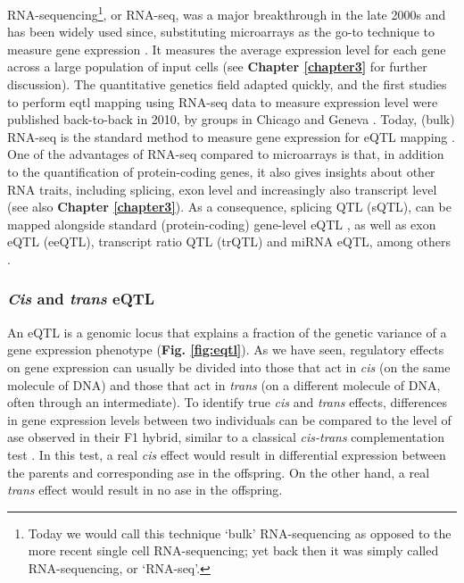 RNA-sequencing\footnote{Today we would call this technique `bulk' RNA-sequencing as opposed to the more recent single cell RNA-sequencing; yet back then it was simply called RNA-sequencing, or `RNA-seq'.}, or RNA-seq, was a major breakthrough in the late 2000s 
and has been widely used since, substituting microarrays as the go-to technique to measure gene expression \cite{weber2015discovering}.
It measures the average expression level for each gene across a large population 
of input cells (see \textbf{Chapter 
\ref{chapter3}}
for further discussion).
The quantitative genetics field adapted quickly, and the first studies to perform \gls{eqtl} mapping using RNA-seq data to measure expression level were published back-to-back in 2010, by groups in Chicago and Geneva
\cite{montgomery2010transcriptome, pickrell2010understanding}.
Today, (bulk) RNA-seq is the standard method to measure gene expression for eQTL mapping \cite{lappalainen2013transcriptome, gtex2015genotype, chen2016genetic}.
One of the advantages of RNA-seq compared to microarrays is that, in addition to the quantification of protein-coding genes, it also  gives insights about other RNA traits, including splicing, exon level and increasingly also transcript level (see also \textbf{Chapter
\ref{chapter3}}).
As a consequence, splicing QTL (sQTL), can be mapped alongside standard (protein-coding) gene-level eQTL \cite{pickrell2010understanding, montgomery2010transcriptome}, as well as exon eQTL (eeQTL), transcript ratio QTL (trQTL) and miRNA eQTL, among others \cite{lappalainen2013transcriptome, bonder2019systematic}.
 
\subsubsection{\textit{Cis} and \textit{trans} eQTL}

An eQTL is a genomic locus that explains a fraction of the genetic variance of a gene expression phenotype (\textbf{Fig. \ref{fig:eqtl}}). 
As we have seen, regulatory effects on gene expression can usually be divided into those that act in \textit{cis} (on the same molecule of DNA) and those that act in \textit{trans} (on a different molecule of DNA, often through an intermediate).
To identify true \textit{cis} and \textit{trans} effects, differences in gene expression levels between two individuals can be compared to the level of \gls{ase} observed in their F1 hybrid, similar to a classical \textit{cis-trans} complementation test \cite{mcmanus2010regulatory, goncalves2012extensive}. 
In this test, a real \textit{cis} effect would result in differential expression between the parents and corresponding \gls{ase} in the offspring. 
On the other hand, a real \textit{trans} effect would result in no \gls{ase} in the offspring. \\

